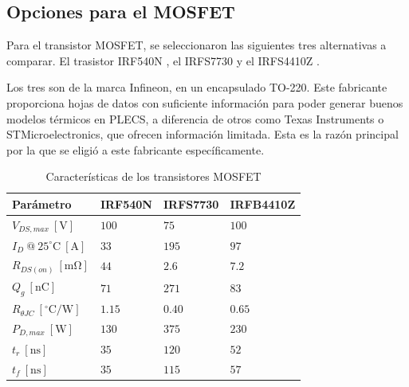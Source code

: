 \documentclass[journal]{IEEEtran}
\begin{document}
\subsection{Opciones para el MOSFET}

Para el transistor MOSFET, se seleccionaron las siguientes tres alternativas a comparar. El trasistor
IRF540N \cite{IRF540N_ds}, el IRFS7730 \cite{IRFS7730_ds} y el IRFS4410Z \cite{IRFS4410Z}. 

\setlength{\parskip}{1em}

Los tres son de la marca Infineon, en un encapsulado TO-220. Este fabricante proporciona hojas de datos con suficiente información para poder generar
buenos modelos térmicos en PLECS, a diferencia de otros como Texas Instruments o STMicroelectronics, que ofrecen información limitada. 
Esta es la razón principal por la que se eligió a este fabricante específicamente. 

\begin{table}[H]
    \centering
    \renewcommand{\arraystretch}{1.5}
    \begin{tabularx}{\columnwidth}{
        >{\hsize=1.3\hsize}X 
        >{\hsize=0.70\hsize}X 
        >{\hsize=0.75\hsize}X 
        >{\hsize=0.75\hsize}X
    }
        \toprule
        Parámetro                                   & IRF540N & IRFS7730 & IRFB4410Z \\
        \midrule
        $V_{DS,max}~\mathrm{[V]}$                   & $100$   & $75$     & $100$     \\
        $I_{D}~@~25^\circ\mathrm{C}~\mathrm{[A]}$   & $33$    & $195$    & $97$      \\
        $R_{DS(on)}~\mathrm{[m\Omega]}$             & $44$    & $2.6$    & $7.2$     \\
        $Q_{g}~\mathrm{[nC]}$                       & $71$    & $271$    & $83$      \\
        $R_{\theta JC}~[^\circ\mathrm{C/W}]$        & $1.15$  & $0.40$   & $0.65$    \\
        $P_{D, max}~\mathrm{[W]}$                   & $130$   & $375$    & $230$     \\
        $t_{r}~\mathrm{[ns]}$                       & $35$    & $120$    & $52$      \\
        $t_{f}~\mathrm{[ns]}$                       & $35$    & $115$    & $57$       \\

        \bottomrule
    \end{tabularx}
    \caption{Características de los transistores MOSFET}
    \label{tab:mosfet_comparison}
\end{table}
\end{document}

